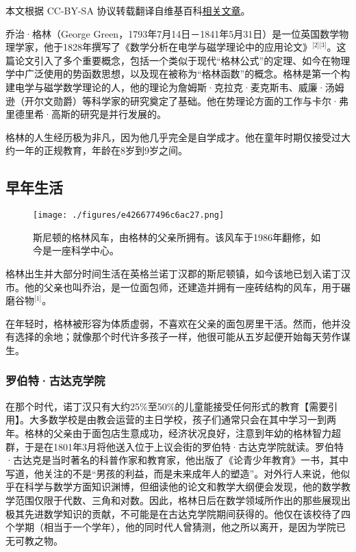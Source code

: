 
本文根据 CC-BY-SA 协议转载翻译自维基百科\href{https://en.wikipedia.org/wiki/George_Green_(mathematician)}{相关文章}。

乔治·格林（George Green，1793年7月14日－1841年5月31日）是一位英国数学物理学家，他于1828年撰写了《数学分析在电学与磁学理论中的应用论文》\(^\text{[2][3]}\)。这篇论文引入了多个重要概念，包括一个类似于现代“格林公式”的定理、如今在物理学中广泛使用的势函数思想，以及现在被称为“格林函数”的概念。格林是第一个构建电学与磁学数学理论的人，他的理论为詹姆斯·克拉克·麦克斯韦、威廉·汤姆逊（开尔文勋爵）等科学家的研究奠定了基础。他在势理论方面的工作与卡尔·弗里德里希·高斯的研究是并行发展的。

格林的人生经历极为非凡，因为他几乎完全是自学成才。他在童年时期仅接受过大约一年的正规教育，年龄在8岁到9岁之间。
\subsection{早年生活}
\begin{figure}[ht]
\centering
\texttt{[image: ./figures/e426677496c6ac27.png]}
\caption{斯尼顿的格林风车，由格林的父亲所拥有。该风车于1986年翻修，如今是一座科学中心。} \label{fig_QZgl_1}
\end{figure}
格林出生并大部分时间生活在英格兰诺丁汉郡的斯尼顿镇，如今该地已划入诺丁汉市。他的父亲也叫乔治，是一位面包师，还建造并拥有一座砖结构的风车，用于碾磨谷物\(^\text{[1]}\)。

在年轻时，格林被形容为体质虚弱，不喜欢在父亲的面包房里干活。然而，他并没有选择的余地；就像那个时代许多孩子一样，他很可能从五岁起便开始每天劳作谋生。
\subsubsection{罗伯特·古达克学院}
在那个时代，诺丁汉只有大约25\%至50\%的儿童能接受任何形式的教育【需要引用】。大多数学校是由教会运营的主日学校，孩子们通常只会在其中学习一到两年。格林的父亲由于面包店生意成功，经济状况良好，注意到年幼的格林智力超群，于是在1801年3月将他送入位于上议会街的罗伯特·古达克学院就读。罗伯特·古达克是当时著名的科普作家和教育家，他出版了《论青少年教育》一书，其中写道，他关注的不是“男孩的利益，而是未来成年人的塑造”。对外行人来说，他似乎在科学与数学方面知识渊博，但细读他的论文和教学大纲便会发现，他的数学教学范围仅限于代数、三角和对数。因此，格林日后在数学领域所作出的那些展现出极其先进数学知识的贡献，不可能是在古达克学院期间获得的。他仅在该校待了四个学期（相当于一个学年），他的同时代人曾猜测，他之所以离开，是因为学院已无可教之物。
